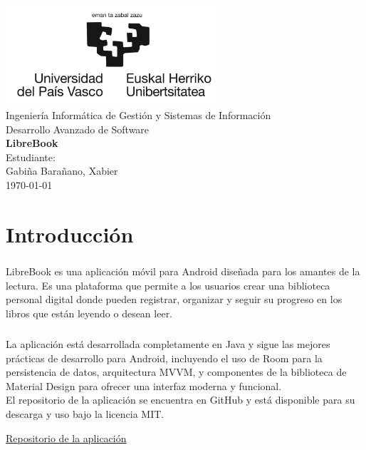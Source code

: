 \documentclass[a4paper,12pt]{report}
\begin{document}
  \begin{titlepage}
      \centering
      \includegraphics[width=0.6\textwidth]{./.img/logo.jpg}\\
      \vspace{1cm}
      \Large Ingeniería Informática de Gestión y Sistemas de Información\\
      \vspace{3cm}
      \Huge Desarrollo Avanzado de Software\\
      \vspace{0.5cm}
      \huge \textbf{LibreBook}\\
      \vspace{7.5cm}
      \Large Estudiante:\\
      \vspace{0.2cm}
      \large Gabiña Barañano, Xabier\\
      \vspace{1cm}
      \vfill
      \today
  \end{titlepage}
  \tableofcontents
  \listoffigures
  \chapter{Introducción}
    \paragraph*{}{
      LibreBook es una aplicación móvil para Android diseñada para los amantes de la lectura. Es una plataforma que permite a los usuarios crear una biblioteca personal digital donde pueden registrar, organizar y seguir su progreso en los libros que están leyendo o desean leer.
    }
    \paragraph*{}{
      La aplicación está desarrollada completamente en Java y sigue las mejores prácticas de desarrollo para Android, incluyendo el uso de Room para la persistencia de datos\cite{room_documentation}, arquitectura MVVM\cite{mvvm_pattern}, y componentes de la biblioteca de Material Design\cite{material_design} para ofrecer una interfaz moderna y funcional.\\
      El repositorio de la aplicación se encuentra en GitHub y está disponible para su descarga y uso bajo la licencia MIT.
    }
    \begin{center}
        \color{blue}\href{https://github.com/Xabierland/DAS-Proyecto}{Repositorio de la aplicación}
    \end{center}
\end{document}
